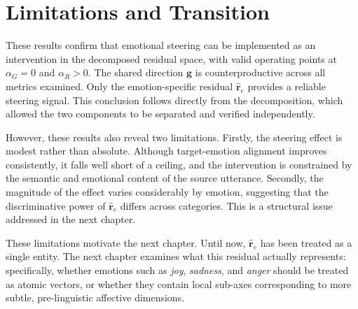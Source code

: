 \section{Limitations and Transition}

These results confirm that emotional steering can be implemented as an intervention in the decomposed residual space, with valid operating points at $\alpha_G = 0$ and $\alpha_R > 0$. The shared direction $\mathbf{g}$ is counterproductive across all metrics examined. Only the emotion-specific residual $\hat{\mathbf{r}}_e$ provides a reliable steering signal. This conclusion follows directly from the decomposition, which allowed the two components to be separated and verified independently.\par

However, these results also reveal two limitations. Firstly, the steering effect is modest rather than absolute. Although target-emotion alignment improves consistently, it falls well short of a ceiling, and the intervention is constrained by the semantic and emotional content of the source utterance. Secondly, the magnitude of the effect varies considerably by emotion, suggesting that the discriminative power of $\hat{\mathbf{r}}_e$ differs across categories. This is a structural issue addressed in the next chapter.\par

These limitations motivate the next chapter. Until now, $\hat{\mathbf{r}}_e$ has been treated as a single entity. The next chapter examines what this residual actually represents: specifically, whether emotions such as \textit{joy}, \textit{sadness}, and \textit{anger} should be treated as atomic vectors, or whether they contain local sub-axes corresponding to more subtle, pre-linguistic affective dimensions.\par
